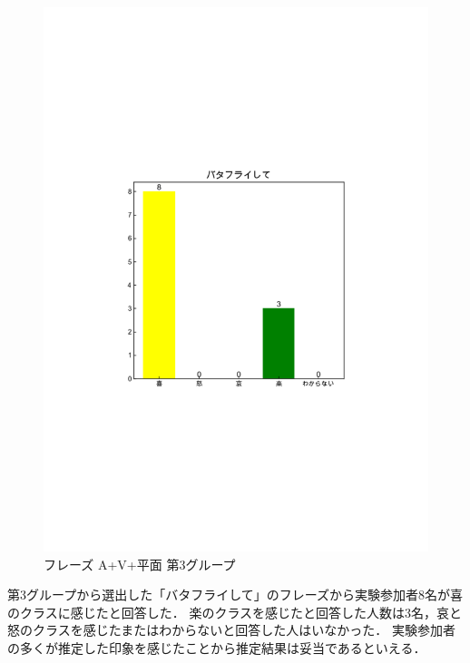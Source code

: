 \begin{figure}[H]
    \centering
    \includegraphics[width=14cm]{433.pdf}
    \vspace{-1mm}
    \caption{フレーズ A+V+平面 第3グループ}
    \label{fig:mms}
    \vspace{5mm}
\end{figure}
第3グループから選出した「バタフライして」のフレーズから実験参加者8名が喜のクラスに感じたと回答した．
楽のクラスを感じたと回答した人数は3名，哀と怒のクラスを感じたまたはわからないと回答した人はいなかった．
実験参加者の多くが推定した印象を感じたことから推定結果は妥当であるといえる．
\newpage
